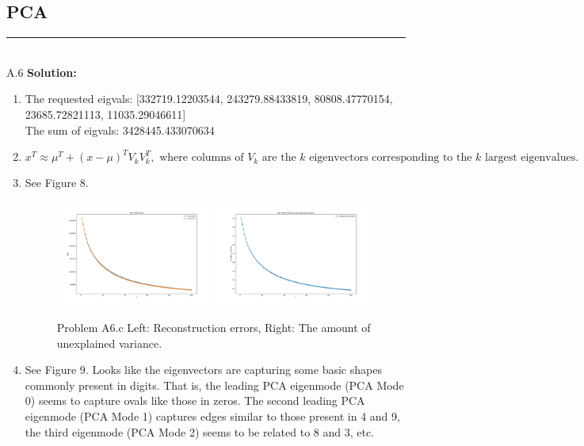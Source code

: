 \documentclass{article}
\newcommand{\1}{\mathbf{1}}
\begin{document}
\subsection*{PCA}
\noindent\rule{\textwidth}{1pt}
\\
A.6 {\bf Solution:}\\
\begin{enumerate}
    \item The requested eigvals: [332719.12203544, 243279.88433819, 80808.47770154,  23685.72821113,  11035.29046611] \\
The sum of eigvals: 3428445.433070634
    \item $$
    x^T \approx \mu^T + (x-\mu)^TV_kV_k^T, \text{  where columns of $V_k$ are the $k$  eigenvectors corresponding to the $k$ largest eigenvalues.}
    $$
    \item See Figure 8.
        \begin{figure}[h!]
            \centering
            \includegraphics[width=0.49\textwidth]{hw3/code/figures/A6c_errors.pdf}
            \includegraphics[width=0.49\textwidth]{hw3/code/figures/A6c_variance.pdf}
            \caption{Problem A6.c Left: Reconstruction errors, Right: The amount of unexplained variance.}
        \end{figure}
    \item See Figure 9. Looks like the eigenvectors are capturing some basic shapes commonly present in digits. That is, the leading PCA eigenmode (PCA Mode 0) seems to capture ovals like those in zeros. The second leading PCA eigenmode (PCA Mode 1) captures edges similar to those present in 4 and 9, the third eigenmode (PCA Mode 2) seems to be related to 8 and 3, etc.

\end{enumerate}
\end{document}
